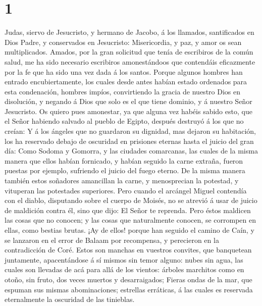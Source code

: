 \hypertarget{section}{%
\section{1}\label{section}}

 Judas, siervo de Jesucristo, y hermano de Jacobo, á los
llamados, santificados en Dios Padre, y conservados en Jesucristo:
 Misericordia, y paz, y amor os sean multiplicados.
 Amados, por la gran solicitud que tenía de escribiros de
la común salud, me ha sido necesario escribiros amonestándoos que
contendáis eficazmente por la fe que ha sido una vez dada á los santos.
 Porque algunos hombres han entrado encubiertamente, los
cuales desde antes habían estado ordenados para esta condenación,
hombres impíos, convirtiendo la gracia de nuestro Dios en disolución, y
negando á Dios que solo es el que tiene dominio, y á nuestro Señor
Jesucristo.  Os quiero pues amonestar, ya que alguna vez
habéis sabido esto, que el Señor habiendo salvado al pueblo de Egipto,
después destruyó á los que no creían:  Y á los ángeles que
no guardaron su dignidad, mas dejaron su habitación, los ha reservado
debajo de oscuridad en prisiones eternas hasta el juicio del gran día:
 Como Sodoma y Gomorra, y las ciudades comarcanas, las
cuales de la misma manera que ellos habían fornicado, y habían seguido
la carne extraña, fueron puestas por ejemplo, sufriendo el juicio del
fuego eterno.  De la misma manera también estos soñadores
amancillan la carne, y menosprecian la potestad, y vituperan las
potestades superiores.  Pero cuando el arcángel Miguel
contendía con el diablo, disputando sobre el cuerpo de Moisés, no se
atrevió á usar de juicio de maldición contra él, sino que dijo: El Señor
te reprenda.  Pero éstos maldicen las cosas que no
conocen; y las cosas que naturalmente conocen, se corrompen en ellas,
como bestias brutas.  ¡Ay de ellos! porque han seguido el
camino de Caín, y se lanzaron en el error de Balaam por recompensa, y
perecieron en la contradicción de Coré.  Estos son
manchas en vuestros convites, que banquetean juntamente, apacentándose á
sí mismos sin temor alguno: nubes sin agua, las cuales son llevadas de
acá para allá de los vientos: árboles marchitos como en otoño, sin
fruto, dos veces muertos y desarraigados;  Fieras ondas
de la mar, que espuman sus mismas abominaciones; estrellas erráticas, á
las cuales es reservada eternalmente la oscuridad de las tinieblas.
